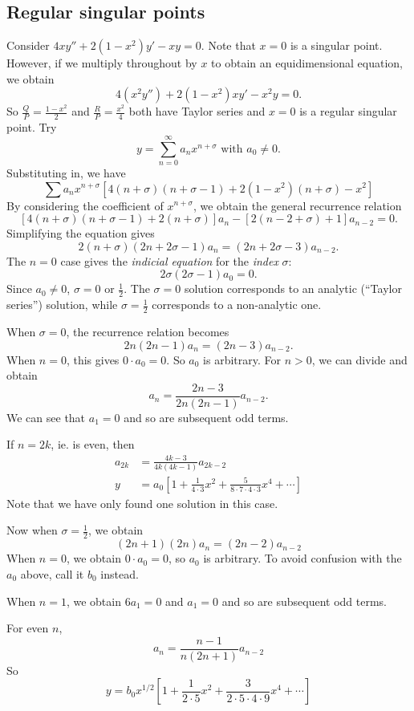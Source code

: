 \documentclass[a4paper]{article}
\begin{document}
  \subsection{Regular singular points}
  \begin{eg}
    Consider $4xy'' + 2(1 - x^2)y' - xy = 0$. Note that $x = 0$ is a singular point. However, if we multiply throughout by $x$ to obtain an equidimensional equation, we obtain
    \[
      4(x^2 y'') + 2(1 - x^2)xy' - x^2 y = 0.
    \]
    So $\frac{Q}{P} = \frac{1 - x^2}{2}$ and $\frac{R}{P} = \frac{x^2}{4}$ both have Taylor series and $x = 0$ is a regular singular point. Try
    \[
      y = \sum_{n = 0}^\infty a_n x^{n + \sigma}\text{ with }a_0 \not= 0.
    \]
    Substituting in, we have
    \[
      \sum a_n x^{n + \sigma}[4(n + \sigma)(n + \sigma - 1) + 2(1 - x^2)(n + \sigma) - x^2]
    \]
    By considering the coefficient of $x^{n + \sigma}$, we obtain the general recurrence relation
    \[
      [4(n + \sigma)(n + \sigma - 1) + 2(n + \sigma)]a_n -[2(n - 2 + \sigma) + 1]a_{n - 2} = 0.
    \]
    Simplifying the equation gives
    \[
      2(n + \sigma)(2n + 2\sigma - 1)a_n = (2n + 2\sigma-3)a_{n - 2}.
    \]
    The $n = 0$  case gives the \emph{indicial equation} for the \emph{index} $\sigma$:
    \[
      2\sigma(2\sigma - 1)a_0 = 0.
    \]
    Since $a_0 \not= 0$, $\sigma = 0$ or $\frac{1}{2}$. The $\sigma = 0$ solution corresponds to an analytic (``Taylor series'') solution, while $\sigma = \frac{1}{2}$ corresponds to a non-analytic one.

    When $\sigma = 0$, the recurrence relation becomes
    \[
      2n(2n - 1)a_n = (2n - 3)a_{n - 2}.
    \]
    When $n = 0$, this gives $0\cdot a_0 = 0$. So $a_0$ is arbitrary. For $n >0$, we can divide and obtain
    \[
      a_n = \frac{2n - 3}{2n(2n - 1)}a_{n - 2}.
    \]
    We can see that $a_1 = 0$ and so are subsequent odd terms.

    If $n = 2k$, ie. is even, then
    \begin{align*}
      a_{2k} &= \frac{4k - 3}{4k(4k - 1)}a_{2k - 2}\\
      y &= a_0\left[1 + \frac{1}{4\cdot 3}x^2 + \frac{5}{8\cdot 7\cdot 4\cdot 3}x^4 + \cdots\right]
    \end{align*}
    Note that we have only found one solution in this case.

    Now when $\sigma = \frac{1}{2}$, we obtain
    \[
      (2n + 1)(2n)a_n = (2n - 2)a_{n - 2}
    \]
    When $n = 0$, we obtain $0\cdot a_0 = 0$, so $a_0$ is arbitrary. To avoid confusion with the $a_0$ above, call it $b_0$ instead.

    When $n = 1$, we obtain $6a_1 = 0$ and $a_1 = 0$ and so are subsequent odd terms.

    For even $n$,
    \[
      a_n = \frac{n - 1}{n(2n + 1)}a_{n - 2}
    \]
    So 
    \[
      y = b_0 x^{1/2}\left[1 + \frac{1}{2\cdot 5}x^2 + \frac{3}{2\cdot 5\cdot 4\cdot 9}x^4 + \cdots\right]
    \]
  \end{eg}
\end{document}
